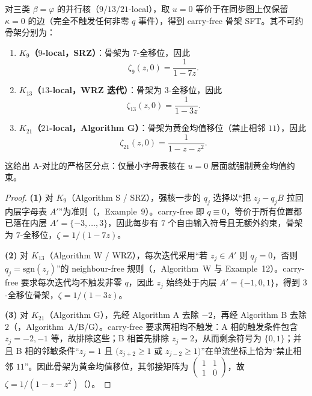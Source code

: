 \begin{proposition}\label{prop:carry-free-skeleton-three}
对三类 $\beta=\varphi$ 的并行核（$9/13/21$-local），取 $u=0$ 等价于在同步图上仅保留 $\kappa=0$ 的边（完全不触发任何非零 $q$ 事件），得到 carry-free 骨架 SFT。其不可约骨架分别为：
\begin{enumerate}
  \item \textbf{$K_9$（$9$-local，SRZ）}：骨架为 $7$-全移位，因此
  \[
  \zeta_{9}(z,0)=\frac{1}{1-7z}.
  \]
  \item \textbf{$K_{13}$（$13$-local，WRZ 迭代）}：骨架为 $3$-全移位，因此
  \[
  \zeta_{13}(z,0)=\frac{1}{1-3z}.
  \]
  \item \textbf{$K_{21}$（$21$-local，Algorithm G）}：骨架为黄金均值移位（禁止相邻 $11$），因此
  \[
  \zeta_{21}(z,0)=\frac{1}{1-z-z^2}.
  \]
\end{enumerate}
这给出 A-对比的严格区分点：仅最小字母表核在 $u=0$ 层面就强制黄金均值约束。
\end{proposition}

\begin{proof}
\textbf{(1)} 对 $K_9$（Algorithm S / SRZ），强核一步的 $q_j$ 选择以“把 $z_j-q_jB$ 拉回内层字母表 $A'$”为准则（\cite{FrougnyHellerPelantovaSvobodovaParallelAlgorithmsSlides}，Example~9）。carry-free 即 $q\equiv 0$，等价于所有位置都已落在内层 $A'=\{-3,\dots,3\}$，因此每步有 $7$ 个自由输入符号且无额外约束，骨架为 $7$-全移位，$\zeta=1/(1-7z)$。

\textbf{(2)} 对 $K_{13}$（Algorithm W / WRZ），每次迭代采用“若 $z_j\in A'$ 则 $q_j=0$，否则 $q_j=\mathrm{sgn}(z_j)$”的 neighbour-free 规则（\cite{FrougnyHellerPelantovaSvobodovaParallelAlgorithmsSlides}，Algorithm~W 与 Example~12）。carry-free 要求每次迭代均不触发非零 $q$，因此 $z_j$ 始终处于内层 $A'=\{-1,0,1\}$，得到 $3$-全移位骨架，$\zeta=1/(1-3z)$。

\textbf{(3)} 对 $K_{21}$（Algorithm G），先经 Algorithm A 去除 $-2$，再经 Algorithm B 去除 $2$（\cite{FrougnyHellerPelantovaSvobodovaParallelAlgorithmsSlides}，Algorithm~A/B/G）。carry-free 要求两相均不触发：A 相的触发条件包含 $z_j=-2,-1$ 等，故排除这些；B 相首先排除 $z_j=2$，从而剩余符号为 $\{0,1\}$；并且 B 相的邻敏条件“$z_j=1$ 且 $(z_{j+2}\ge 1$ 或 $z_{j-2}\ge 1)$”在单流坐标上恰为“禁止相邻 $11$”。因此骨架为黄金均值移位，其邻接矩阵为 $\begin{pmatrix}1&1\\1&0\end{pmatrix}$，故 $\zeta=1/(1-z-z^2)$（\cite{LindMarcus1995}）。
\end{proof}


